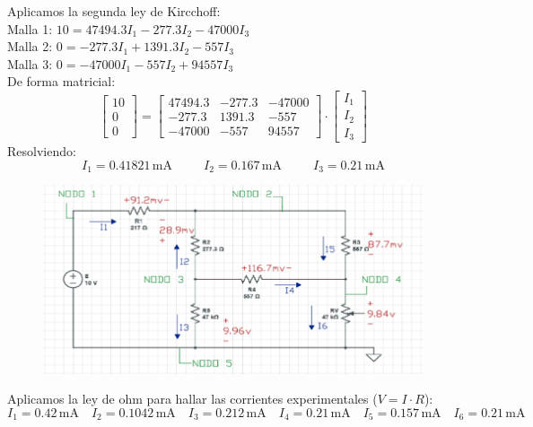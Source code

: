 \documentclass[a4paper,12pt]{report}
\begin{document}
\begin{enumerate}
\begin{figure}[H]
\begin{center}
\end{center}
\end{figure}
Aplicamos la segunda ley de Kircchoff:\\
Malla 1: $10 = 47494.3I_{1} - 277.3I_{2} - 47000I_{3}$\\
Malla 2: $0 = -277.3I_{1} + 1391.3I_{2} - 557I_{3}$\\
Malla 3: $0 = -47000I_{1} - 557I_{2} + 94557I_{3}$\\
De forma matricial:
$$
\begin{bmatrix}
10\\
0\\
0
\end{bmatrix}
 = 
\begin{bmatrix}
47494.3 & -277.3 & -47000\\
-277.3 & 1391.3 & -557\\
-47000 & -557 & 94557
\end{bmatrix} \cdot \begin{bmatrix}
I_{1}\\
I_{2}\\
I_{3}
\end{bmatrix}
$$
Resolviendo:
$$
I_{1} = 0.41821\,\mathrm{mA} \hspace{30pt} I_{2} = 0.167\,\mathrm{mA} \hspace{30pt} I_{3} = 0.21\,\mathrm{mA}
$$
\begin{figure}[H]
\begin{center}
\includegraphics[scale=0.45]{sergodcirc3,1.png}
\end{center}
\end{figure}
Aplicamos la ley de ohm para hallar las corrientes experimentales ($V = I \cdot R$):
$$
I_{1} = 0.42\,\mathrm{mA} \hspace{12pt} I_{2} = 0.1042\,\mathrm{mA} \hspace{12pt} I_{3}=0.212\,\mathrm{mA} \hspace{12pt} I_{4} = 0.21\,\mathrm{mA} \hspace{12pt} I_{5} = 0.157\,\mathrm{mA} \hspace{12pt} I_{6} = 0.21\,\mathrm{mA}
$$
\end{enumerate}
\end{document}
